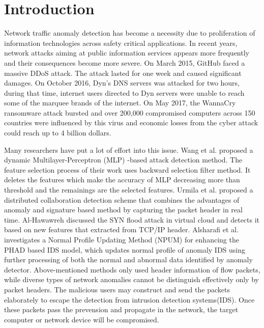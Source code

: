 \documentclass{ieeeaccess}
\theoremstyle{definition}
\begin{document}
\titlepgskip=-15pt

\maketitle

\section{Introduction}
\label{sec:introduction}
Network traffic anomaly detection has become a necessity due to proliferation of information technologies across safety critical applications. In recent years, network attacks aiming at public information services appears more frequently and their consequences become more severe.
On March 2015, GitHub faced a massive DDoS attack. The attack lasted for one week and caused significant damages\cite{github-2015}. On October 2016, Dyn's DNS servers was attacked for two hours, during that time, internet users directed to Dyn servers were unable to reach some of the marquee brands of the internet\cite{dyn-2016}. On May 2017, the WannaCry ransomware attack bursted and over 200,000 compromised computers across 150 countries were influenced by this virus and economic losses from the cyber attack could reach up to 4 billion dollars\cite{wannacry-2017}.

Many researchers have put a lot of effort into this issue.
Wang et al.\cite{Wang2020CS} proposed a dynamic Multilayer-Perceptron (MLP) -based attack detection method. The feature selection process of their work uses backward selection filter method. It deletes the features which make the accuracy of MLP decreasing more than threshold and the remainings are the selected features. Urmila et al.\cite{Urmila2017} proposed a distributed collaboration detection scheme that combines the advantages of anomaly and signature based method by capturing the packet header in real time. Al-Hawawreh\cite{MunaSulieman2017} discussed the SYN flood attack in virtual cloud and detects it based on new features that extracted from TCP/IP header. Alsharafi et al.\cite{Alsharafi2020} investigates a Normal Profile Updating Method (NPUM) for enhancing the PHAD based IDS model, which updates normal profile of anomaly IDS using further processing of both the normal and abnormal data identified by anomaly detector. 
Above-mentioned methods only used header information of flow packets, while diverse types of network anomalies cannot be distinguish effectively only by packet headers. The malicious users may construct and send the packets elaborately to escape the detection from intrusion detection systems(IDS). Once these packets pass the prevension and propagate in the network, the target computer or network device will be compromised.
\end{document}
